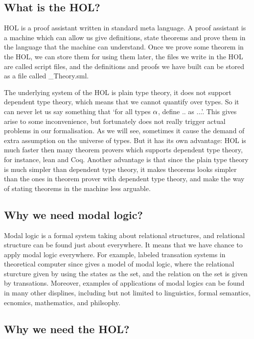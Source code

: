 \documentclass[letterpaper]{article}
\renewcommand{\HOLinline}[1]{\ensuremath{#1}}
\begin{document}
\subsection{What is the HOL?}

HOL is a proof assistant written in standard meta language. A proof assistant is a machine which can allow us give definitions, state theorems and prove them in the language that the machine can understand. Once we prove some theorem in the HOL, we can store them for using them later, the files we write in the HOL are called script files, and the definitions and proofs we have built can be stored as a file called \_Theory.sml.


The underlying system of the HOL is plain type theory, it does not support dependent type theory, which means that  we cannot quantify over types. So it can never let us say something that `for all types \HOLinline{\HOLFreeVar{\ensuremath{\alpha}}}, define .. as ...'. This gives arise to some inconvenience,  but fortunately does not really trigger actual problems in our formalisation. As we will see, sometimes it cause the demand of extra assumption on the universe of types. But it has its own advantage: HOL is much faster then many theorem provers which supports dependent type theory, for instance, lean and Coq. Another advantage is that since the plain type theory is much simpler than dependent type theory, it makes theorems looks simpler than the ones in theorem prover with dependent type theory, and make the way of stating theorems in the machine less arguable.


\subsection{Why we need modal logic?}

Modal logic is a formal system taking about relational structures, and relational structure can be found just about everywhere. It means that we have chance to apply modal logic everywhere. For example, labeled transation systems in theoretical computer since gives a model of modal logic, where the relational sturcture given by using the states as the set, and the relation on the set is given by transations. Moreover, examples of applications of modal logics can be found in many other displines, including but not limited to linguistics, formal semantics, ecnomics, mathematics, and philsophy. 

\subsection{Why we need the HOL?}
\end{document}
